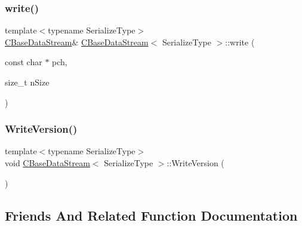 \mbox{\label{class_c_base_data_stream_a82d8850aa10720a065628ca72d12801b}} 
\subsubsection{\texorpdfstring{write()}{write()}}
{\footnotesize\ttfamily template$<$typename Serialize\+Type$>$ \\
\mbox{\hyperlink{class_c_base_data_stream}{C\+Base\+Data\+Stream}}\& \mbox{\hyperlink{class_c_base_data_stream}{C\+Base\+Data\+Stream}}$<$ Serialize\+Type $>$\+::write (\begin{DoxyParamCaption}\item[{const char $\ast$}]{pch,  }\item[{size\+\_\+t}]{n\+Size }\end{DoxyParamCaption})\hspace{0.3cm}{\ttfamily [inline]}}

\mbox{\label{class_c_base_data_stream_a5ecdb53462dbc5dbf976b12482852223}} 
\subsubsection{\texorpdfstring{Write\+Version()}{WriteVersion()}}
{\footnotesize\ttfamily template$<$typename Serialize\+Type$>$ \\
void \mbox{\hyperlink{class_c_base_data_stream}{C\+Base\+Data\+Stream}}$<$ Serialize\+Type $>$\+::Write\+Version (\begin{DoxyParamCaption}{ }\end{DoxyParamCaption})\hspace{0.3cm}{\ttfamily [inline]}}



\subsection{Friends And Related Function Documentation}
\mbox{\label{class_c_base_data_stream_af7942137a7d02a674bc7bedb0190cb1d}} 
